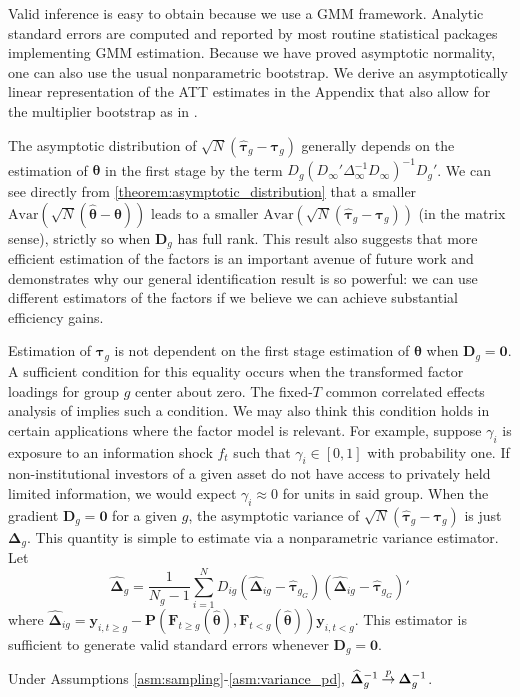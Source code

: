 \documentclass[12pt]{article}
\begin{document}
Valid inference is easy to obtain because we use a GMM framework. Analytic standard errors are computed and reported by most routine statistical packages implementing GMM estimation. Because we have proved asymptotic normality, one can also use the usual nonparametric bootstrap. We derive an asymptotically linear representation of the ATT estimates in the Appendix that also allow for the multiplier bootstrap as in \citet{Callaway_Karami_2020}. 

The asymptotic distribution of $\sqrt{N}(\widehat{\bm \tau}_g - \bm \tau_{g})$ generally depends on the estimation of $\bm \theta$ in the first stage by the term $D_g (D_\infty' \Delta_\infty^{-1} D_\infty)^{-1} D_g'$. We can see directly from \autoref{theorem:asymptotic_distribution} that a smaller $\text{Avar}(\sqrt{N}(\widehat{\bm \theta} - \bm \theta))$ leads to a smaller $\text{Avar}(\sqrt{N}(\widehat{\bm \tau}_g - \bm \tau_g))$ (in the matrix sense), strictly so when $\bm D_g$ has full rank. This result also suggests that more efficient estimation of the factors is an important avenue of future work and demonstrates why our general identification result is so powerful: we can use different estimators of the factors if we believe we can achieve substantial efficiency gains. 

Estimation of $\bm \tau_g$ is not dependent on the first stage estimation of $\bm \theta$ when $\bm D_g = \bm 0$. A sufficient condition for this equality occurs when the transformed factor loadings for group $g$ center about zero. The fixed-$T$ common correlated effects analysis of \citet{Westerlund_Petrova_Norkute_2019} implies such a condition. We may also think this condition holds in certain applications where the factor model is relevant. For example, suppose $\gamma_i$ is exposure to an information shock $f_t$ such that $\gamma_i \in [0,1]$ with probability one. If non-institutional investors of a given asset do not have access to privately held limited information, we would expect $\gamma_i \approx 0$ for units in said group. When the gradient $\bm D_g = \bm 0$ for a given $g$, the asymptotic variance of $\sqrt{N}(\widehat{\bm \tau}_g - \bm \tau_g)$ is just $\bm \Delta_g$. This quantity is simple to estimate via a nonparametric variance estimator. Let 
\begin{equation}\label{eq:nonparametric_variance}
  \widehat{\bm \Delta}_g = \frac{1}{N_g - 1} \sum_{i = 1}^N D_{ig} \left( \widehat{\bm \Delta}_{ig} - \widehat{\bm \tau}_{g_G} \right) \left( \widehat{\bm \Delta}_{ig} - \widehat{\bm \tau}_{g_G} \right)'
\end{equation}
where $\widehat{\bm \Delta}_{ig} = \bm y_{i, t \geq g} - \bm P(\bm F_{t \geq g}(\widehat{\bm \theta}), \bm F_{t < g}(\widehat{\bm \theta})) \bm y_{i, t < g}$. This estimator is sufficient to generate valid standard errors whenever $\bm D_g = \bm 0$.
\begin{theorem}\label{theorem:nonparametric_variance}
  Under Assumptions \ref{asm:sampling}-\ref{asm:variance_pd}, $\widehat{\bm \Delta}_g^{-1} \mathbin{\overset{p}{\to}} \bm \Delta_g^{-1}$.
\end{theorem}
\end{document}
